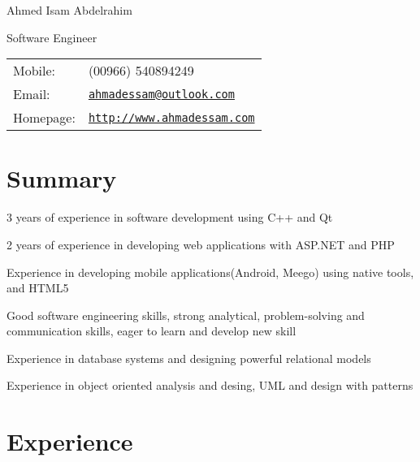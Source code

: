 \documentclass[letterpaper]{article}
\def\name{Ahmed Isam Abdelrahim}
\renewenvironment{itemize}{
  \begin{list}{}{
    \setlength{\leftmargin}{1.5em}
  }
}{
  \end{list}
}
\begin{document}
{\huge \name}


\vspace{0.10in}

\begin{minipage}{0.45\linewidth}
  Software Engineer \\
 
\end{minipage}
\begin{minipage}{0.45\linewidth}
  \begin{tabular}{ll}
    Mobile: & (00966) 540894249 \\
    Email: & \href{mailto:ahmadessam@outlook.com}{\tt ahmadessam@outlook.com} \\
    Homepage: & \href{http://www.ahmadessam.com}{\tt http://www.ahmadessam.com} \\
  \end{tabular}
\end{minipage}

\section*{Summary}
\begin{itemize}
\item 3 years of experience in software development using C++ and Qt
\item 2 years of experience in developing web applications with ASP.NET and PHP
\item Experience in developing mobile applications(Android, Meego) using native tools, and HTML5
\item Good software engineering skills, strong analytical, problem-solving and communication skills, eager to learn and develop new skill
\item Experience in database systems and designing powerful relational models
\item Experience in object oriented analysis and desing, UML and design with patterns
\end{itemize}


\section*{Experience}
\end{document}
